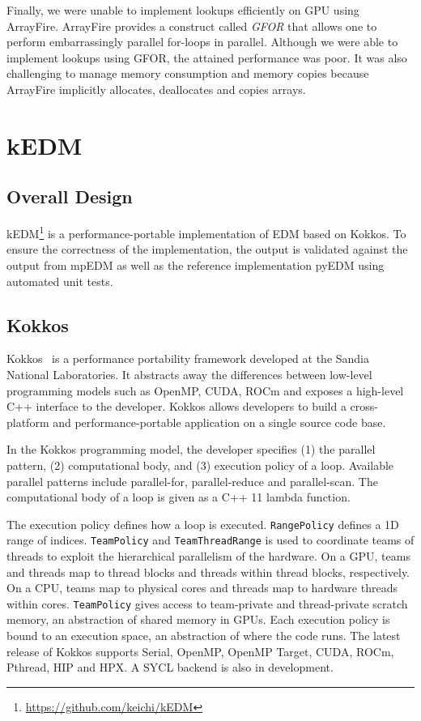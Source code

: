 \documentclass[conference]{IEEEtran}
\begin{document}
Finally, we were unable to implement lookups efficiently on GPU using
ArrayFire. ArrayFire provides a construct called \textit{GFOR} that allows one
to perform embarrassingly parallel for-loops in parallel. Although we were
able to implement lookups using GFOR, the attained performance was poor. It
was also challenging to manage memory consumption and memory copies because
ArrayFire implicitly allocates, deallocates and copies arrays.

\section{kEDM}\label{sec:proposal}

\subsection{Overall Design}

kEDM\footnote{\url{https://github.com/keichi/kEDM}} is a performance-portable
implementation of EDM based on Kokkos. To ensure the correctness of the
implementation, the output is validated against the output from mpEDM as well
as the reference implementation pyEDM using automated unit tests.

\subsection{Kokkos}

Kokkos~\cite{Edwards2014} is a performance portability framework developed at
the Sandia National Laboratories. It abstracts away the differences between
low-level programming models such as OpenMP, CUDA, ROCm and exposes a
high-level C++ interface to the developer. Kokkos allows developers to build a
cross-platform and performance-portable application on a single source code
base.

In the Kokkos programming model, the developer specifies (1) the parallel
pattern, (2) computational body, and (3) execution policy of a loop. Available
parallel patterns include parallel-for, parallel-reduce and parallel-scan. The
computational body of a loop is given as a C++ 11 lambda function.

The execution policy defines how a loop is executed. \texttt{RangePolicy}
defines a 1D range of indices. \texttt{TeamPolicy} and \texttt{TeamThreadRange}
is used to coordinate teams of threads to exploit the hierarchical parallelism
of the hardware. On a GPU, teams and threads map to thread blocks and threads
within thread blocks, respectively. On a CPU, teams map to physical cores and
threads map to hardware threads within cores. \texttt{TeamPolicy} gives access
to team-private and thread-private scratch memory, an abstraction of shared
memory in GPUs. Each execution policy is bound to an execution space, an
abstraction of where the code runs. The latest release of Kokkos supports
Serial, OpenMP, OpenMP Target, CUDA, ROCm, Pthread, HIP and HPX\@. A SYCL
backend is also in development.
\end{document}
